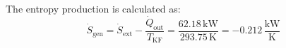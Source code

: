The entropy production is calculated as:  
\[
\dot{S}_{\text{gen}} = \dot{S}_{\text{ext}} - \frac{\dot{Q}_{\text{out}}}{T_{\text{KF}}} = \frac{62.18 \, \text{kW}}{293.75 \, \text{K}} = -0.212 \, \frac{\text{kW}}{\text{K}}
\]